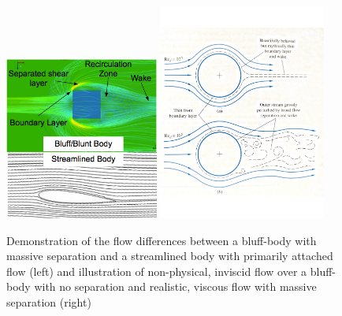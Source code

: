 \documentclass[journal]{new-aiaa}
\begin{document}
\begin{figure}[htb]
\begin{center}
\includegraphics[width=0.45\textwidth]{Images/logan/bluntVSstreamline.png}
\includegraphics[width=0.49\textwidth]{Images/logan/white2011fluid_BluffBodyInviscidVSViscous.pdf}
\caption{ Demonstration of the flow differences between a bluff-body with massive separation \cite{richards2015modelling} and a streamlined body with primarily attached flow (left) and illustration of non-physical, inviscid flow over a bluff-body with no separation and realistic, viscous flow with massive separation (right) \cite{white2011fluid} }
\label{fig:bluffvsstreamlined}
\end{center}
\end{figure}
\end{document}
